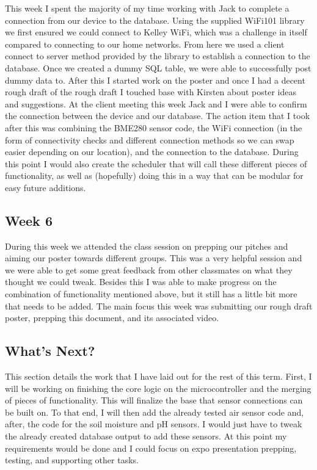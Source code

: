 \documentclass[IEEEtran,letterpaper,10pt,titlepage,fleqn,draftclsnofoot,onecolumn]{article}
\begin{document}
This week I spent the majority of my time working with Jack to complete a connection from our device to the database. Using the supplied WiFi101 library we first ensured we could connect to Kelley WiFi, which was a challenge in itself compared to connecting to our home networks. From here we used a client connect to server method provided by the library to establish a connection to the database. Once we created a dummy SQL table, we were able to successfully post dummy data to. After this I started work on the poster and once I had a decent rough draft of the rough draft I touched base with Kirsten about poster ideas and suggestions. At the client meeting this week Jack and I were able to confirm the connection between the device and our database. The action item that I took after this was combining the BME280 sensor code, the WiFi connection (in the form of connectivity checks and different connection methods so we can swap easier depending on our location), and the connection to the database. During this point I would also create the scheduler that will call these different pieces of functionality, as well as (hopefully) doing this in a way that can be modular for easy future additions.

\subsection{Week 6}

During this week we attended the class session on prepping our pitches and aiming our poster towards different groups. This was a very helpful session and we were able to get some great feedback from other classmates on what they thought we could tweak. Besides this I was able to make progress on the combination of functionality mentioned above, but it still has a little bit more that needs to be added. The main focus this week was submitting our rough draft poster, prepping this document, and its associated video.

\subsection{What's Next?}

This section details the work that I have laid out for the rest of this term. First, I will be working on finishing the core logic on the microcontroller and the merging of pieces of functionality. This will finalize the base that sensor connections can be built on. To that end, I will then add the already tested air sensor code and, after, the code for the soil moisture and pH sensors. I would just have to tweak the already created database output to add these sensors. At this point my requirements would be done and I could focus on expo presentation prepping, testing, and supporting other tasks.
\end{document}
